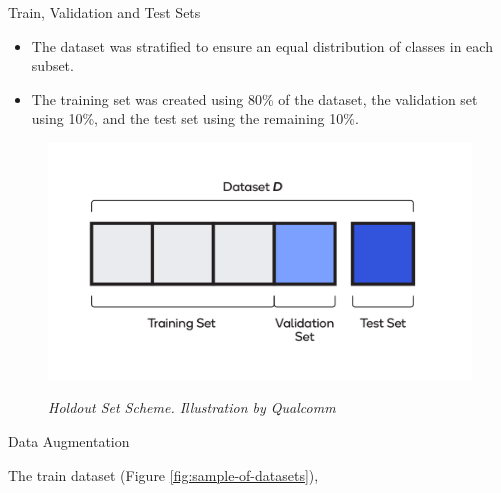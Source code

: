 \documentclass[dvipsnames,mathserif]{beamer}
\begin{document}
{\begin{frame}
    \end{frame}

    \begin{frame}

      \large  Train, Validation and Test Sets
      \vspace{0.25cm}

      \footnotesize

      \begin{itemize}
        \item The dataset was stratified to ensure an equal distribution of classes in each subset.
        \item The training set was created using 80\% of the dataset, the validation set using 10\%, and the test set using the remaining 10\%.
      \end{itemize}


      \begin{figure}[H]
        \centering
        \begin{adjustbox}{width=0.5\textwidth, trim={0cm 0.5cm 0cm 0.5cm}, clip}
          \includegraphics[width=\textwidth]{images/train-test-validation-sets.png}
        \end{adjustbox}
        \caption[Holdout Set Scheme]{\textit{Holdout Set Scheme. Illustration by Qualcomm}}
        {\label{fig:holdout-test-scheme}}
      \end{figure}

    \end{frame}

    \begin{frame}

      \large Data Augmentation
      \vspace{0.25cm}

      \footnotesize

      The train dataset (Figure \ref{fig:sample-of-datasets}),


\end{frame}}
\end{document}
